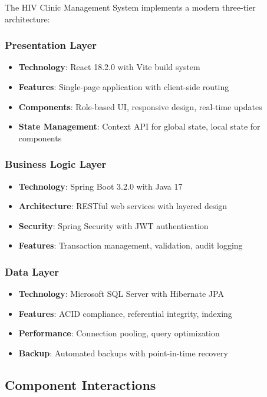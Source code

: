 \documentclass[12pt,a4paper]{article}
\begin{document}
The HIV Clinic Management System implements a modern three-tier architecture:

\subsubsection{Presentation Layer}
\begin{itemize}
    \item \textbf{Technology}: React 18.2.0 with Vite build system
    \item \textbf{Features}: Single-page application with client-side routing
    \item \textbf{Components}: Role-based UI, responsive design, real-time updates
    \item \textbf{State Management}: Context API for global state, local state for components
\end{itemize}

\subsubsection{Business Logic Layer}
\begin{itemize}
    \item \textbf{Technology}: Spring Boot 3.2.0 with Java 17
    \item \textbf{Architecture}: RESTful web services with layered design
    \item \textbf{Security}: Spring Security with JWT authentication
    \item \textbf{Features}: Transaction management, validation, audit logging
\end{itemize}

\subsubsection{Data Layer}
\begin{itemize}
    \item \textbf{Technology}: Microsoft SQL Server with Hibernate JPA
    \item \textbf{Features}: ACID compliance, referential integrity, indexing
    \item \textbf{Performance}: Connection pooling, query optimization
    \item \textbf{Backup}: Automated backups with point-in-time recovery
\end{itemize}

\subsection{Component Interactions}
\end{document}
